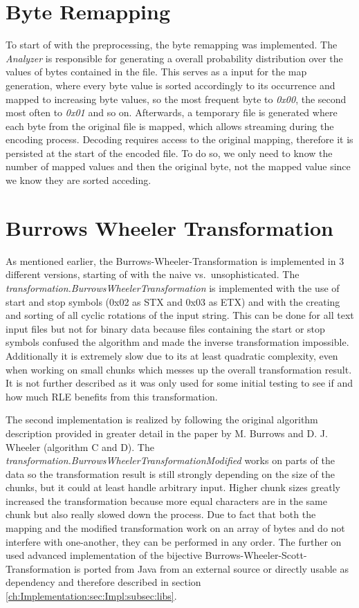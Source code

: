 \section{Byte Remapping}
\label{ch:Implementation:bytemapping}
\par{
	To start of with the preprocessing, the byte remapping was implemented. The \emph{Analyzer} is responsible for generating a overall probability distribution over the values of bytes contained in the file. This serves as a input for the map generation, where every byte value is sorted accordingly to its occurrence and mapped to increasing byte values, so the most frequent byte to \textit{0x00}, the second most often to \textit{0x01} and so on. Afterwards, a temporary file is generated where each byte from the original file is mapped, which allows streaming during the encoding process. Decoding requires access to the original mapping, therefore it is persisted at the start of the encoded file. To do so, we only need to know the number of mapped values and then the original byte, not the mapped value since we know they are sorted acceding.
}
\section{Burrows Wheeler Transformation}
\label{ch:Implementation:bwt}
\par{
	As mentioned earlier, the Burrows-Wheeler-Transformation is implemented in 3 different versions, starting of with the naive vs.\ unsophisticated. The \emph{transformation.BurrowsWheelerTransformation} is implemented with the use of start and stop symbols (0x02 as STX and 0x03 as ETX) and with the creating and sorting of all cyclic rotations of the input string. This can be done for all text input files but not for binary data because files containing the start or stop symbols confused the algorithm and made the inverse transformation impossible. Additionally it is extremely slow due to its at least quadratic complexity, even when working on small chunks which messes up the overall transformation result. It is not further described as it was only used for some initial testing to see if and how much RLE benefits from this transformation. 
}
\par{
	The second implementation is realized by following the original algorithm description provided in greater detail in the paper by M. Burrows and D. J. Wheeler \cite{Burrows94} (algorithm C and D). The \emph{transformation.BurrowsWheelerTransformationModified} works on parts of the data so the transformation result is still strongly depending on the size of the chunks, but it could at least handle arbitrary input. Higher chunk sizes greatly increased the transformation because more equal characters are in the same chunk but also really slowed down the process. Due to fact that both the mapping and the modified transformation work on an array of bytes and do not interfere with one-another, they can be performed in any order. The further on used advanced implementation of the bijective Burrows-Wheeler-Scott-Transformation is ported from Java from an external source or directly usable as dependency and therefore described in section \ref{ch:Implementation:sec:Impl:subsec:libs}.
}
